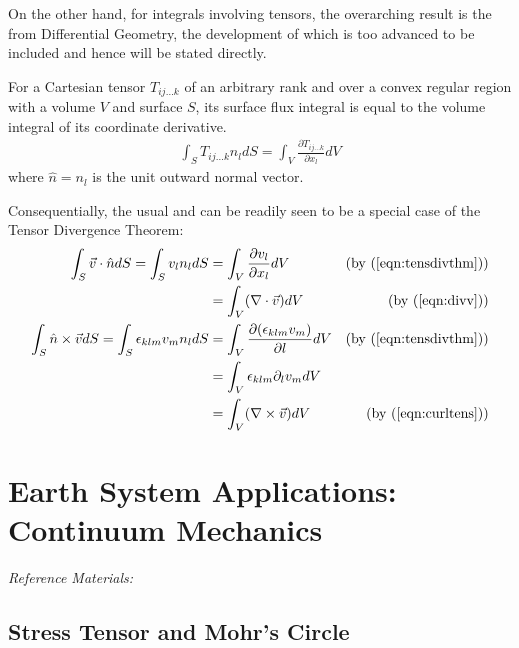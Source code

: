On the other hand, for integrals involving tensors, the overarching result is the  from Differential Geometry, the development of which is too advanced to be included and hence will be stated directly.
\begin{thm}
For a Cartesian tensor $T_{ij\ldots k}$ of an arbitrary rank and over a convex regular region with a volume $V$ and surface $S$, its surface flux integral is equal to the volume integral of its coordinate derivative.
\begin{align}
\int_S T_{ij\ldots k}n_l dS = \int_V \frac{\partial T_{ij\ldots k}}{\partial x_l} dV \label{eqn:tensdivthm}
\end{align}
where $\hat{n} = n_l$ is the unit outward normal vector.
\end{thm}
Consequentially, the usual  and  can be readily seen to be a special case of the Tensor Divergence Theorem:
\begin{align}
\int_S \vec{v}\cdot \hat{n} dS = \int_S v_ln_l dS &= \int_V \frac{\partial v_l}{\partial x_l} dV \nonumber &\text{(by (\ref{eqn:tensdivthm}))} \\ 
&= \int_V (\nabla \cdot \vec{v}) dV &\text{(by (\ref{eqn:divv}))} \label{eqn:divthm} \\
\int_S \hat{n} \times \vec{v} dS = \int_S \epsilon_{klm}v_mn_l dS &= \int_V \frac{\partial (\epsilon_{klm}v_m)}{\partial l} dV \nonumber &\text{(by (\ref{eqn:tensdivthm}))} \\
&= \int_V \epsilon_{klm}\partial_lv_m dV \nonumber \\
&= \int_V (\nabla \times \vec{v}) dV &\text{(by (\ref{eqn:curltens}))} \label{eqn:stokes}
\end{align}

\section{Earth System Applications: Continuum Mechanics}

\textit{Reference Materials: \cite{TFWong}}

\subsection{Stress Tensor and Mohr's Circle}

